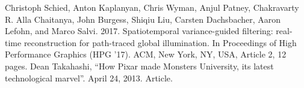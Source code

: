\documentclass[conference]{IEEEtran}
\begin{document}
\begin{thebibliography}{12}
 Christoph Schied, Anton Kaplanyan, Chris Wyman, Anjul Patney, Chakravarty R. Alla Chaitanya, John Burgess, Shiqiu Liu, Carsten Dachsbacher, Aaron Lefohn, and Marco Salvi. 2017. Spatiotemporal variance-guided filtering: real-time reconstruction for path-traced global illumination. In Proceedings of High Performance Graphics (HPG '17). ACM, New York, NY, USA, Article 2, 12 pages.
 Dean Takahashi, ``How Pixar made Monsters University, its
latest technological marvel''. April 24, 2013. Article.
\end{thebibliography}
\end{document}
